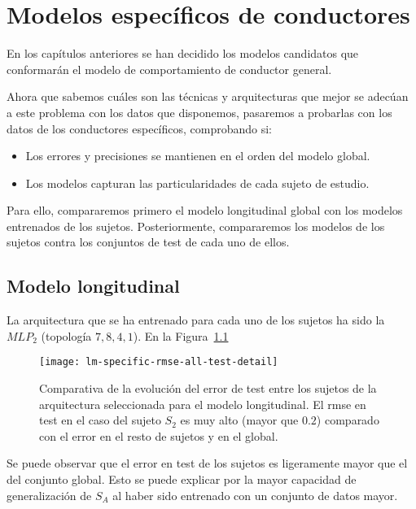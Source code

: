\chapter{Modelos específicos de conductores}
\label{ch:specific-models}

En los capítulos anteriores se han decidido los modelos candidatos que conformarán el modelo de comportamiento de conductor general.

Ahora que sabemos cuáles son las técnicas y arquitecturas que mejor se adecúan a este problema con los datos que disponemos, pasaremos a probarlas con los datos de los conductores específicos, comprobando si:

\begin{itemize}
	\item Los errores y precisiones se mantienen en el orden del modelo global.
	\item Los modelos capturan las particularidades de cada sujeto de estudio.
\end{itemize}

Para ello, compararemos primero el modelo longitudinal global con los modelos entrenados de los sujetos. Posteriormente, compararemos los modelos de los sujetos contra los conjuntos de test de cada uno de ellos.

\section{Modelo longitudinal}

La arquitectura que se ha entrenado para cada uno de los sujetos ha sido la $MLP_2$ (topología $7, 8, 4, 1$). En la Figura~\ref{fig:lm-specific-training-validation-and-test-comparison} 

\begin{figure}[!b]
	\centering
	\texttt{[image: lm-specific-rmse-all-test-detail]}
	\caption[Comparativa de la evolución del \gls{rmse} en test para los sujetos de la arquitectura seleccionada para el modelo longitudinal]{Comparativa de la evolución del error de test entre los sujetos de la arquitectura seleccionada para el modelo longitudinal. El \gls{rmse} en test en el caso del sujeto $S_2$ es muy alto (mayor que $0.2$) comparado con el error en el resto de sujetos y en el global.}
	\label{fig:lm-specific-training-validation-and-test-comparison}
\end{figure}

Se puede observar que el error en test de los sujetos es ligeramente mayor que el del conjunto global. Esto se puede explicar por la mayor capacidad de generalización de $S_A$ al haber sido entrenado con un conjunto de datos mayor.

